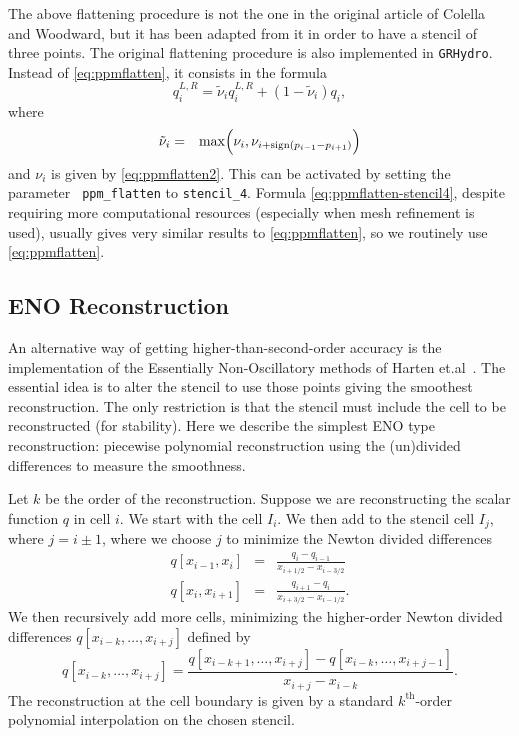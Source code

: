 \documentclass{article}
\begin{document}
The above flattening procedure is not the one in the original article of Colella and Woodward, but
it has been adapted from it in order to have a stencil of three points.  The original flattening
procedure is also implemented in {\tt GRHydro}. Instead of \ref{eq:ppmflatten}, it consists in the formula
\begin{equation}
  \label{eq:ppmflatten-stencil4}
  q_i^{L,R} = \tilde \nu_i q_i^{L,R} + (1 - \tilde \nu_i) q_i,
\end{equation}
where
\begin{eqnarray}
\tilde \nu_i &=& {\rm max}\Big(\nu_i,\nu_{i+{\rm sign}(p_{i-1}-p_{i+1})}\Big)
\end{eqnarray}
and $\nu_i$ is given by \ref{eq:ppmflatten2}. This can be activated by setting the parameter {\tt
ppm\_flatten} to {\tt stencil\_4}. Formula \ref{eq:ppmflatten-stencil4}, despite requiring
more computational resources (especially when mesh refinement is used), usually gives very similar
results to \ref{eq:ppmflatten}, so we routinely use \ref{eq:ppmflatten}.


\subsection{ENO Reconstruction}
\label{sec:eno}

An alternative way of getting higher-than-second-order accuracy is the implementation of the
Essentially Non-Oscillatory methods of Harten et.al~\cite{eno}. The
essential idea is to alter the stencil to use those points giving the
smoothest reconstruction. The only restriction is that the stencil
must include the cell to be reconstructed (for stability). Here we
describe the simplest ENO type reconstruction: piecewise polynomial
reconstruction using the (un)divided differences to measure the
smoothness. 

Let $k$ be the order of the reconstruction. Suppose we are
reconstructing the scalar function $q$ in cell $i$. We start with the
cell $I_i$. We then add to the stencil cell $I_j$, where $j = i \pm
1$, where we choose $j$ to minimize the Newton divided differences
\begin{eqnarray}
  \label{enodd}
  q \left[ x_{i-1}, x_i \right] & = & \frac{q_i - q_{i-1}}{x_{i+1/2}
    - x_{i-3/2}} \\
  q \left[ x_i, x_{i+1} \right] & = & \frac{q_{i+1} - q_i}{x_{i+3/2}
    - x_{i-1/2}}.
\end{eqnarray}
\noindent We then recursively add more cells, minimizing the higher-order 
Newton divided differences $q \left[ x_{i-k}, \dots, x_{i+j} \right]$
defined by 
\begin{equation}
  \label{enodd2}
  q \left[ x_{i-k}, \dots, x_{i+j} \right] = \frac{ q \left[ x_{i-k+1},
  \dots, x_{i+j} \right] - q \left[ x_{i-k}, \dots, x_{i+j-1} \right]
  }{x_{i+j} - x_{i-k}}.
\end{equation}
\noindent The reconstruction at the cell boundary is given by a
standard $k^{\textrm{th}}$-order polynomial interpolation on the chosen
stencil. 
\end{document}
